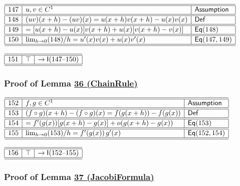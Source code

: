 \documentclass[11pt,reqno]{amsart}
\begin{document}
\noindent$%
\begin{array}{|r|l|l|}
\hline\hline
147 & u,v\in C^{1} & \textsf{Assumption} \\ \hline\hline
148 & (uv)(x+h)-(uv)(x)=u(x+h)v(x+h)-u(x)v(x) & \mathsf{Def} \\ \hline\hline
149 & =[u(x+h)-u(x)]v(x+h)+u(x)[v(x+h)-v(x)] & \mathsf{Eq}(148) \\ \hline\hline
150 & \lim_{h\to0}(148)/h=u^{\prime }(x)v(x)+u(x)v^{\prime }(x) & \mathsf{Eq}(147,149) \\ \hline\hline
\end{array}%
$

\medskip

\noindent$%
\begin{array}{|r|l|l|}
\hline\hline
151 & \top & \to\mathsf{I}(147\text{--}150) \\ \hline\hline
\end{array}%
$

\medskip

\subsubsection*{Proof of Lemma \hyperlink{lem:ChainRule}{36 (\textsf{ChainRule})}}

\noindent$%
\begin{array}{|r|l|l|}
\hline\hline
152 & f,g\in C^{1} & \textsf{Assumption} \\ \hline\hline
153 & (f\circ g)(x+h)-(f\circ g)(x)=f(g(x+h))-f(g(x)) & \mathsf{Def} \\ \hline\hline
154 & =f^{\prime }(g(x))[g(x+h)-g(x)]+o(g(x+h)-g(x)) & \mathsf{Eq}(153) \\ \hline\hline
155 & \lim_{h\to0}(153)/h=f^{\prime }(g(x))\,g^{\prime }(x) & \mathsf{Eq}(152,154) \\ \hline\hline
\end{array}%
$

\medskip

\noindent$%
\begin{array}{|r|l|l|}
\hline\hline
156 & \top & \to\mathsf{I}(152\text{--}155) \\ \hline\hline
\end{array}%
$

\medskip

\subsubsection*{Proof of Lemma \hyperlink{lem:JacobiFormula}{37 (\textsf{JacobiFormula})}}
\end{document}
